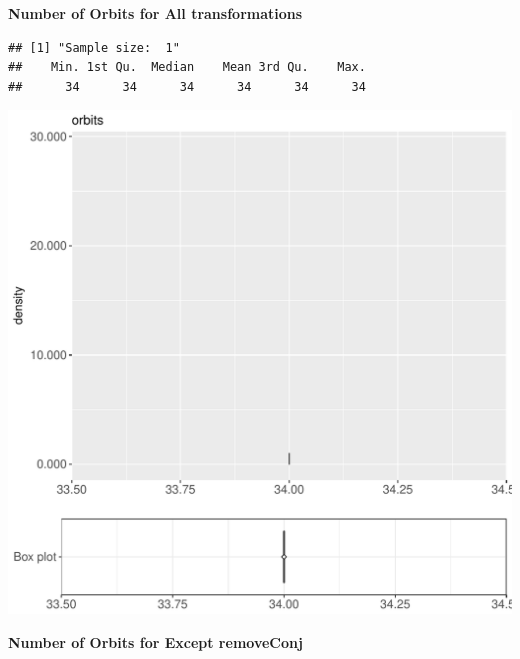 \documentclass{article}\usepackage[]{graphicx}\usepackage[]{color}
\makeatletter
\def\maxwidth{ %
  \ifdim\Gin@nat@width>\linewidth
    \linewidth
  \else
    \Gin@nat@width
  \fi
}
\newenvironment{kframe}{%
 \def\at@end@of@kframe{}%
 \ifinner\ifhmode%
  \def\at@end@of@kframe{\end{minipage}}%
  \begin{minipage}{\columnwidth}%
 \fi\fi%
 \def\FrameCommand##1{\hskip\@totalleftmargin \hskip-\fboxsep
 \colorbox{shadecolor}{##1}\hskip-\fboxsep
     \hskip-\linewidth \hskip-\@totalleftmargin \hskip\columnwidth}%
 \MakeFramed {\advance\hsize-\width
   \@totalleftmargin\z@ \linewidth\hsize
   \@setminipage}}%
 {\par\unskip\endMakeFramed%
 \at@end@of@kframe}
\newenvironment{knitrout}{}{} %
\makeatother
\begin{document}
 \textbf{Number of Orbits for All transformations}
\begin{knitrout}
\color{fgcolor}\begin{kframe}
\begin{verbatim}
## [1] "Sample size:  1"
##    Min. 1st Qu.  Median    Mean 3rd Qu.    Max. 
##      34      34      34      34      34      34
\end{verbatim}


{\ttfamily\noindent\bfseries{}}\end{kframe}
\includegraphics[width=\maxwidth]{figure/RH7_cashew_big-1} 

\end{knitrout}
 \textbf{Number of Orbits for Except removeConj}
\end{document}
